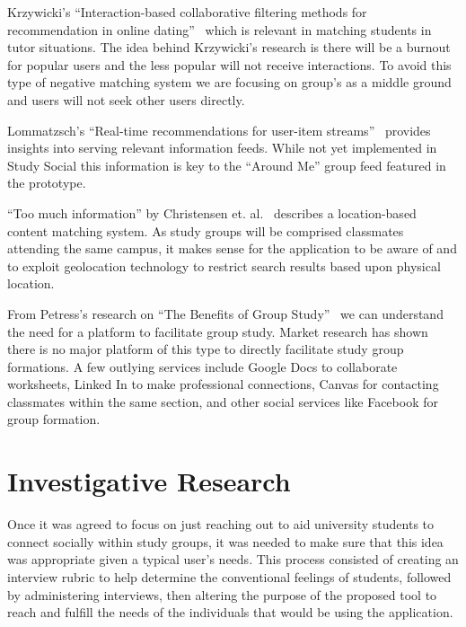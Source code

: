 \documentclass{sigchi-ext}
\begin{document}
Krzywicki's ``Interaction-based collaborative filtering methods for
recommendation in online dating''~\cite{krzywicki2010interaction} which is
relevant in matching students in tutor situations. The idea behind
Krzywicki's research is there will be a burnout for popular users and the
less popular will not receive interactions.  To avoid this type of negative
matching system we are focusing on group's as a middle ground and users will
not seek other users directly.

Lommatzsch's ``Real-time recommendations for user-item
streams''~\cite{lommatzsch2015real} provides insights into serving relevant
information feeds. While not yet implemented in Study Social this information
is key to the ``Around Me'' group feed featured in the prototype.

``Too much information'' by Christensen et. al.~\cite{christensen2006too}
describes a location-based content matching system. As study groups will be
comprised classmates attending the same campus, it makes sense for the
application to be aware of and to exploit geolocation technology to restrict
search results based upon physical location. 

From Petress's research on ``The Benefits of Group
Study''~\cite{petress2004benefits} we can understand the need for a platform to
facilitate group study. Market research has shown there is no major platform of
this type to directly facilitate study group formations. A few outlying
services include Google Docs to collaborate worksheets, Linked In to make
professional connections, Canvas for contacting classmates within the same
section, and other social services like Facebook for group formation.




\section{Investigative Research}


Once it was agreed to focus on just reaching out to aid university students
to connect socially within study groups, it was needed to make sure that
this idea was appropriate given a typical user's needs. This process
consisted of creating an interview rubric to help determine the
conventional feelings of students, followed by administering interviews,
then altering the purpose of the proposed tool to reach and fulfill the
needs of the individuals that would be using the application.
\end{document}
